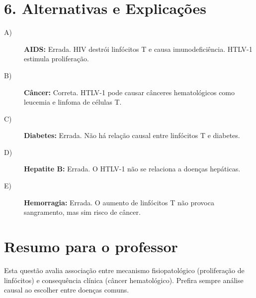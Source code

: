 \documentclass{article}
\begin{document}
\section*{6. Alternativas e Explicações}
\begin{description}
  \item[A)] \textbf{AIDS:} Errada. HIV destrói linfócitos T e causa imunodeficiência. HTLV-1 estimula proliferação.
  \item[B)] \textbf{Câncer:} Correta. HTLV-1 pode causar cânceres hematológicos como leucemia e linfoma de células T.
  \item[C)] \textbf{Diabetes:} Errada. Não há relação causal entre linfócitos T e diabetes.
  \item[D)] \textbf{Hepatite B:} Errada. O HTLV-1 não se relaciona a doenças hepáticas.
  \item[E)] \textbf{Hemorragia:} Errada. O aumento de linfócitos T não provoca sangramento, mas sim risco de câncer.
\end{description}

\section*{Resumo para o professor}
Esta questão avalia associação entre mecanismo fisiopatológico (proliferação de linfócitos) e consequência clínica (câncer hematológico). Prefira sempre análise causal ao escolher entre doenças comuns.
\end{document}
